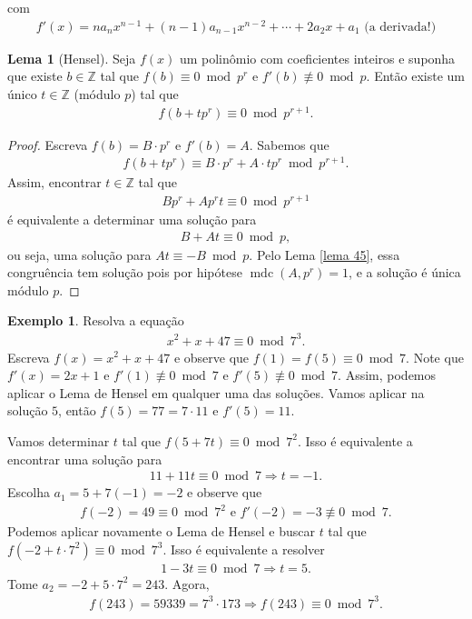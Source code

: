 \documentclass[a4paper,11pt,twoside, leqno]{article}
\DeclareMathOperator{\mdc}{mdc}
\theoremstyle{definition}
\newtheorem{lemma}[theorem]{Lema}
\newtheorem*{example}{Exemplo}
\begin{document}
com
\begin{align*}
f'(x) = na_nx^{n-1} + (n-1)a_{n-1}x^{n-2} + \cdots + 2a_2x + a_1 \text{ (a derivada!)}
\end{align*}
\begin{lemma}[Hensel]
	\label{lema de Hensel}
	Seja $f(x)$ um polinômio com coeficientes inteiros e suponha que existe $b\in\mathbb{Z}$ tal que $f(b)\equiv 0\bmod p^r$ e $f'(b)\not\equiv 0\bmod p$. Então existe um único $t\in\mathbb{Z}$ (módulo $p$) tal que
	\begin{align*}
	f(b + tp^r) \equiv 0\bmod p^{r+1}.
	\end{align*}
\end{lemma}
\begin{proof}
	Escreva $f(b) = B\cdot p^r$ e $f'(b) = A$. Sabemos que
	\begin{align*}
	f(b + tp^r) \equiv B\cdot p^r + A\cdot tp^r \bmod p^{r+1}.
	\end{align*}
	Assim, encontrar $t\in\mathbb{Z}$ tal que
	\begin{align*}
	Bp^r + Ap^rt\equiv 0\bmod p^{r+1}
	\end{align*}
	é equivalente a determinar uma solução para
	\begin{align*}
	B + At \equiv 0\bmod p,
	\end{align*}
	ou seja, uma solução para $At\equiv -B\bmod p$. Pelo Lema \eqref{lema 45}, essa congruência tem solução pois por hipótese $\mdc(A,p^r) = 1$, e a solução é única módulo $p$.
\end{proof}
\begin{example}
	Resolva a equação
	\begin{align*}
	x^2 + x + 47\equiv 0\bmod 7^3.
	\end{align*}
	Escreva $f(x) = x^2 + x + 47$ e observe que $f(1) = f(5) \equiv 0\bmod 7$. Note que $f'(x) = 2x + 1$ e $f'(1)\not\equiv 0\bmod 7$ e $f'(5)\not\equiv 0\bmod 7$. Assim, podemos aplicar o Lema de Hensel em qualquer uma das soluções. Vamos aplicar na solução $5$, então $f(5) = 77 = 7\cdot 11$ e $f'(5) = 11$.
	\par\vspace{0.3cm} Vamos determinar $t$ tal que $f(5 + 7t) \equiv 0\bmod 7^2$. Isso é equivalente a encontrar uma solução para
	\begin{align*}
	11 + 11t\equiv 0\bmod 7 \Rightarrow t = -1.
	\end{align*}
	Escolha $a_1 = 5 + 7(-1) = -2$ e observe que
	\begin{align*}
	f(-2) = 49\equiv 0\bmod 7^2 \text{ e } f'(-2) = -3\not\equiv 0\bmod 7.
	\end{align*}
	Podemos aplicar novamente o Lema de Hensel e buscar $t$ tal que $f(-2 + t\cdot 7^2)\equiv 0\bmod 7^3$. Isso é equivalente a resolver
	\begin{align*}
	1 - 3t \equiv 0\bmod 7 \Rightarrow t = 5.
	\end{align*}
	Tome $a_2 = -2 + 5\cdot 7^2 = 243$. Agora,
	\begin{align*}
	f(243) = 59339 = 7^3\cdot 173 \Rightarrow f(243) \equiv 0\bmod 7^3.
	\end{align*}
\end{example}
\end{document}
